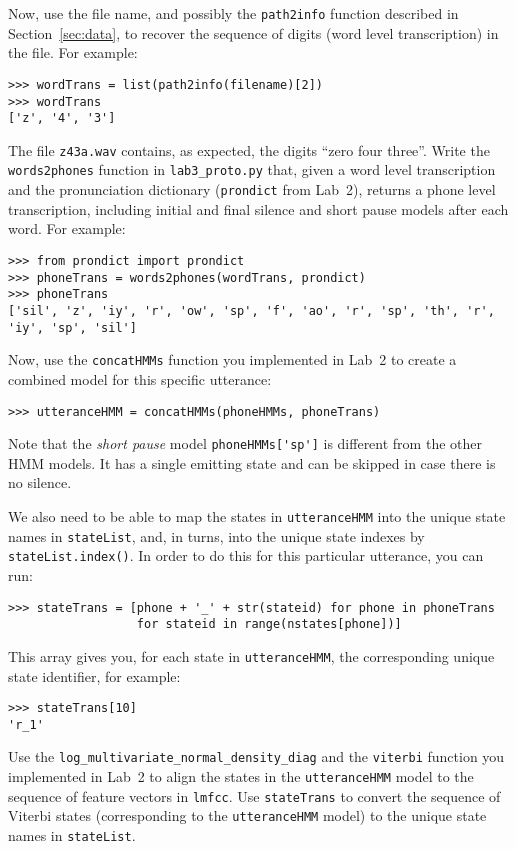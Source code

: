 \documentclass{nada-ten}
\begin{document}
Now, use the file name, and possibly the \texttt{path2info} function described in Section~\ref{sec:data}, to recover the sequence of digits (word level transcription) in the file. For example:
\begin{verbatim}
>>> wordTrans = list(path2info(filename)[2])
>>> wordTrans
['z', '4', '3']
\end{verbatim}
The file \texttt{z43a.wav} contains, as expected, the digits ``zero four three''. Write the \texttt{words2phones} function in \texttt{lab3\_proto.py} that, given a word level transcription and the pronunciation dictionary (\texttt{prondict} from Lab~2), returns a phone level transcription, including initial and final silence and short pause models after each word. For example:
\begin{verbatim}
>>> from prondict import prondict
>>> phoneTrans = words2phones(wordTrans, prondict)
>>> phoneTrans
['sil', 'z', 'iy', 'r', 'ow', 'sp', 'f', 'ao', 'r', 'sp', 'th', 'r', 'iy', 'sp', 'sil']
\end{verbatim}

Now, use the \texttt{concatHMMs} function you implemented in Lab~2 to create a combined model for this specific utterance:
\begin{verbatim}
>>> utteranceHMM = concatHMMs(phoneHMMs, phoneTrans)
\end{verbatim}

Note that the \emph{short pause} model \verb|phoneHMMs['sp']| is different from the other HMM models. It has a single emitting state and can be skipped in case there is no silence.

We also need to be able to map the states in \texttt{utteranceHMM} into the unique state names in \texttt{stateList}, and, in turns, into the unique state indexes by \texttt{stateList.index()}. In order to do this for this particular utterance, you can run:
\begin{verbatim}
>>> stateTrans = [phone + '_' + str(stateid) for phone in phoneTrans
                  for stateid in range(nstates[phone])]
\end{verbatim}
This array gives you, for each state in \texttt{utteranceHMM}, the corresponding unique state identifier, for example:
\begin{verbatim}
>>> stateTrans[10]
'r_1'
\end{verbatim}

Use the \texttt{log\_multivariate\_normal\_density\_diag} and the \texttt{viterbi} function you implemented in Lab~2 to align the states in the \texttt{utteranceHMM} model to the sequence of feature vectors in \texttt{lmfcc}. Use \texttt{stateTrans} to convert the sequence of Viterbi states (corresponding to the \texttt{utteranceHMM} model) to the unique state names in \texttt{stateList}.
\end{document}
